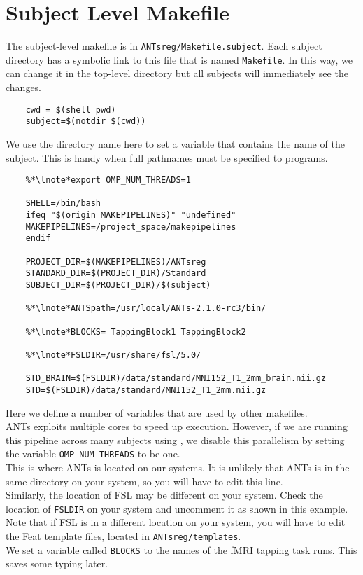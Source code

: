 \section{Subject Level Makefile}
The subject-level makefile is in
\texttt{ANTsreg/Makefile.subject}. Each subject directory has a
symbolic link to this file that is named \texttt{Makefile}. In this
way, we can change it in the top-level directory but all subjects will
immediately see the changes.

\begin{lstlisting}
	cwd = $(shell pwd)
	subject=$(notdir $(cwd))
\end{lstlisting}
We use the directory name here to set a variable that contains the
name of the subject. This is handy when full pathnames must be
specified to programs. 

\begin{lstlisting}
	%*\lnote*export OMP_NUM_THREADS=1

	SHELL=/bin/bash
	ifeq "$(origin MAKEPIPELINES)" "undefined"
	MAKEPIPELINES=/project_space/makepipelines
	endif

	PROJECT_DIR=$(MAKEPIPELINES)/ANTsreg
	STANDARD_DIR=$(PROJECT_DIR)/Standard
	SUBJECT_DIR=$(PROJECT_DIR)/$(subject)

	%*\lnote*ANTSpath=/usr/local/ANTs-2.1.0-rc3/bin/

	%*\lnote*BLOCKS= TappingBlock1 TappingBlock2

	%*\lnote*FSLDIR=/usr/share/fsl/5.0/

	STD_BRAIN=$(FSLDIR)/data/standard/MNI152_T1_2mm_brain.nii.gz
	STD=$(FSLDIR)/data/standard/MNI152_T1_2mm.nii.gz
\end{lstlisting}

Here we define a number of variables that are used by other
makefiles. \\
 ANTs exploits multiple cores to speed up
execution. However, if we are running this pipeline across many
subjects using \maken{}, we disable this parallelism by setting the
variable \texttt{OMP_NUM_THREADS} to be one. \\
 This is where
ANTs is located on our systems. It is unlikely that ANTs is in the
same directory on your system, so you will have to edit this line.\\
 Similarly, the location of FSL may be different on your
system. Check the location of \texttt{FSLDIR} on your system and
uncomment it as shown in this example. Note that if FSL is in a
different location on your system, you will have to edit the Feat template files, located in
\texttt{ANTsreg/templates}. \\
 We set a variable
called \texttt{BLOCKS} to the names of the fMRI tapping task
runs. This saves some typing later.\\

